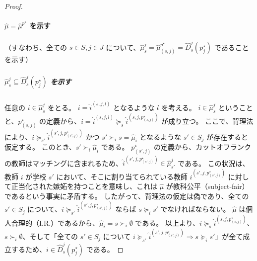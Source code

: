 \documentclass[12pt, a4paper]{article}
\theoremstyle{definition}
\theoremstyle{remark}
\theoremstyle{plain}
\begin{document}
\begin{proof}



\paragraph{\(\widehat{\mu} = \widehat{\mu}^{p^\star}\) を示す}
（すなわち、全ての \(s \in S, j \in J\) について、\(\widehat{\mu}_s^j = \widehat{\mu}_{(s,j)}^{p^\star} = \widehat{D}_s^j(p_j^\star)\) であることを示す）

\subparagraph{\(\widehat{\mu}_s^j \subseteq \widehat{D}_s^j(p_j^\star)\) を示す}
任意の \(i \in \widehat{\mu}_s^j\) をとる。
\(i = \widehat{i}^{(s,j,l)}\) となるような \(l\) を考える。
\(i \in \widehat{\mu}_s^j\) ということと、$p_{(s,j)}^\star$ の定義から、$i = \widehat{i}^{(s,j,l)} \succeq_s \widehat{i}^{(s,j,p_{(s,j)}^\star)}$ が成り立つ。
ここで、背理法により、$i \succeq_{s'} \widehat{i}^{(s',j,p_{(s',j)}^\star)}$ かつ $s' \succ_i s = \widehat{\mu}_i$ となるような $s' \in S_j$ が存在すると仮定する。
このとき、$s' \succ_i \widehat{\mu}_i$ である。
$p^\star_{(s',j)}$ の定義から、カットオフランクの教師はマッチングに含まれるため、$\widehat{i}^{(s',j,p^\star_{(s',j)})} \in \widehat{\mu}_{s'}^j$ である。
この状況は、教師 $i$ が学校 $s'$ において、そこに割り当てられている教師 $\widehat{i}^{(s',j,p^\star_{(s',j)})}$ に対して正当化された嫉妬を持つことを意味し、これは $\widehat{\mu}$ が教科公平（subject-fair）であるという事実に矛盾する。
したがって、背理法の仮定は偽であり、全ての $s' \in S_j$ について、$i \succeq_{s'} \widehat{i}^{(s',j,p_{(s',j)}^\star)}$ ならば $s \succeq_i s'$ でなければならない。
$\widehat{\mu}$ は個人合理的（I.R.）であるから、$\widehat{\mu}_i = s \succ_i \emptyset$ である。
以上より、$i \succeq_s \widehat{i}^{(s,j,p_{(s,j)}^\star)}$、$s \succ_i \emptyset$、そして「全ての $s' \in S_j$ について $i \succeq_{s'} \widehat{i}^{(s',j,p_{(s',j)}^\star)} \Rightarrow s \succeq_i s'$」が全て成立するため、$i \in \widehat{D}_s^j(p_j^\star)$ である。



\end{proof}
\end{document}
